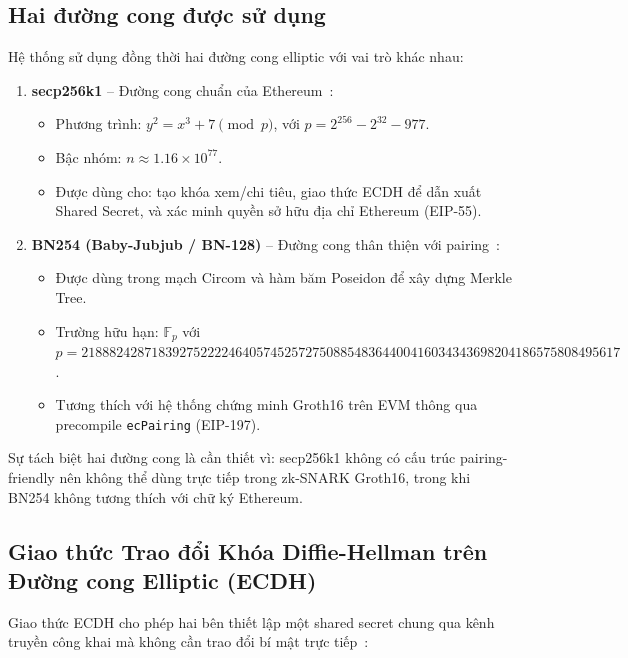 \documentclass[../DoAn.tex]{subfiles}
\begin{document}
\subsection{Hai đường cong được sử dụng}

Hệ thống sử dụng đồng thời hai đường cong elliptic với vai trò khác nhau:

\begin{enumerate}
    \item \textbf{secp256k1} -- Đường cong chuẩn của Ethereum~\cite{erc5564}:
    \begin{itemize}
        \item Phương trình: \(y^2 = x^3 + 7 \pmod{p}\), với \(p = 2^{256} - 2^{32} - 977\).
        \item Bậc nhóm: \(n \approx 1.16 \times 10^{77}\).
        \item Được dùng cho: tạo khóa xem/chi tiêu, giao thức ECDH để dẫn xuất Shared Secret, và xác minh quyền sở hữu địa chỉ Ethereum (EIP-55).
    \end{itemize}

    \item \textbf{BN254 (Baby-Jubjub / BN-128)} -- Đường cong thân thiện với pairing~\cite{groth16}:
    \begin{itemize}
        \item Được dùng trong mạch Circom và hàm băm Poseidon để xây dựng Merkle Tree.
        \item Trường hữu hạn: \(\mathbb{F}_p\) với \(p = 21888242871839275222246405745257275088548364400416034343698204186575808495617\).
        \item Tương thích với hệ thống chứng minh Groth16 trên EVM thông qua precompile \texttt{ecPairing} (EIP-197).
    \end{itemize}
\end{enumerate}

Sự tách biệt hai đường cong là cần thiết vì: secp256k1 không có cấu trúc pairing-friendly nên không thể dùng trực tiếp trong zk-SNARK Groth16, trong khi BN254 không tương thích với chữ ký Ethereum.

\subsection{Giao thức Trao đổi Khóa Diffie-Hellman trên Đường cong Elliptic (ECDH)}
\label{subsec:ecdh}

Giao thức ECDH cho phép hai bên thiết lập một shared secret chung qua kênh truyền công khai mà không cần trao đổi bí mật trực tiếp~\cite{ecc}:
\end{document}
